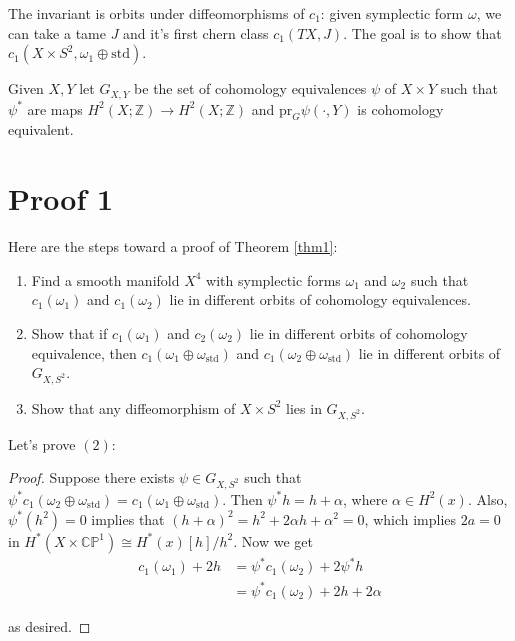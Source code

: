 The invariant is orbits under diffeomorphisms of $c_1$: given symplectic form $\omega$, we can take a tame $J$ and it's first chern class $c_1(TX,J)$. The goal is to show that $c_1(X\times S^2, \omega_1 \oplus \text{std})$.

\begin{definition}

Given $X,Y$ let $G_{X,Y}$ be the set of cohomology equivalences $\psi$ of $X\times Y$ such that $\psi^*$ are maps $H^2(X; \mathbb{Z})\to H^2(X; \mathbb{Z})$ and $\text{pr}_G\psi(\cdot, Y)$ is cohomology equivalent.

\end{definition}

\section{Proof 1}

Here are the steps toward a proof of Theorem \ref{thm1}:

\begin{enumerate}
\item Find a smooth manifold $X^4$ with symplectic forms $\omega_1$ and $\omega_2$ such that $c_1(\omega_1)$ and $c_1(\omega_2)$ lie in different orbits of cohomology equivalences.
\item Show that if $c_1(\omega_1)$ and $c_2(\omega_2)$ lie in different orbits of cohomology equivalence, then $c_1(\omega_1 \oplus \omega_{\text{std}})$ and $c_1(\omega_2 \oplus \omega_{\text{std}})$ lie in different orbits of $G_{X, S^2}$.
\item Show that any diffeomorphism of $X\times S^2$ lies in $G_{X,S^2}$.
\end{enumerate}

Let's prove $(2)$:

\begin{proof}
Suppose there exists $\psi \in G_{X,S^2}$ such that $\psi^* c_1(\omega_2 \oplus \omega_{\text{std}})=c_1(\omega_1 \oplus \omega_{\text{std}})$. Then $\psi^* h = h+\alpha$, where $\alpha \in H^2(x)$. Also, $\psi^*(h^2)=0$ implies that $(h+\alpha)^2 = h^2 + 2\alpha h + \alpha^2 =0$, which implies $2a=0$ in $H^*(X\times \mathbb{CP}^1)\cong H^*(x)[h]/h^2$. Now we get
\begin{align*}
c_1(\omega_1) + 2h &= \psi^* c_1(\omega_2) + 2\psi^* h \\
&= \psi^* c_1(\omega_2)+2h+2\alpha
\end{align*}

as desired.
\end{proof}

